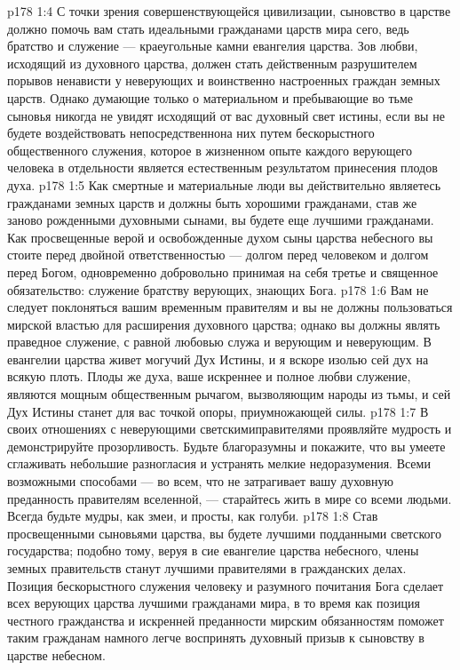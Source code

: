 \vs p178 1:4 С точки зрения совершенствующейся цивилизации, сыновство в царстве должно помочь вам стать идеальными гражданами царств мира сего, ведь братство и служение --- краеугольные камни евангелия царства. Зов любви, исходящий из духовного царства, должен стать действенным разрушителем порывов ненависти у неверующих и воинственно настроенных граждан земных царств. Однако думающие только о материальном и пребывающие во тьме сыновья никогда не увидят исходящий от вас духовный свет истины, если вы не будете воздействовать непосредственнона них путем бескорыстного общественного служения, которое в жизненном опыте каждого верующего человека в отдельности является естественным результатом принесения плодов духа.
\vs p178 1:5 Как смертные и материальные люди вы действительно являетесь гражданами земных царств и должны быть хорошими гражданами, став же заново рожденными духовными сынами, вы будете еще лучшими гражданами. Как просвещенные верой и освобожденные духом сыны царства небесного вы стоите перед двойной ответственностью --- долгом перед человеком и долгом перед Богом, одновременно добровольно принимая на себя третье и священное обязательство: служение братству верующих, знающих Бога.
\vs p178 1:6 Вам не следует поклоняться вашим временным правителям и вы не должны пользоваться мирской властью для расширения духовного царства; однако вы должны являть праведное служение, с равной любовью служа и верующим и неверующим. В евангелии царства живет могучий Дух Истины, и я вскоре изолью сей дух на всякую плоть. Плоды же духа, ваше искреннее и полное любви служение, являются мощным общественным рычагом, вызволяющим народы из тьмы, и сей Дух Истины станет для вас точкой опоры, приумножающей силы.
\vs p178 1:7 В своих отношениях с неверующими светскимиправителями проявляйте мудрость и демонстрируйте прозорливость. Будьте благоразумны и покажите, что вы умеете сглаживать небольшие разногласия и устранять мелкие недоразумения. Всеми возможными способами --- во всем, что не затрагивает вашу духовную преданность правителям вселенной, --- старайтесь жить в мире со всеми людьми. Всегда будьте мудры, как змеи, и просты, как голуби.
\vs p178 1:8 Став просвещенными сыновьями царства, вы будете лучшими подданными светского государства; подобно тому, веруя в сие евангелие царства небесного, члены земных правительств станут лучшими правителями в гражданских делах. Позиция бескорыстного служения человеку и разумного почитания Бога сделает всех верующих царства лучшими гражданами мира, в то время как позиция честного гражданства и искренней преданности мирским обязанностям поможет таким гражданам намного легче воспринять духовный призыв к сыновству в царстве небесном.
